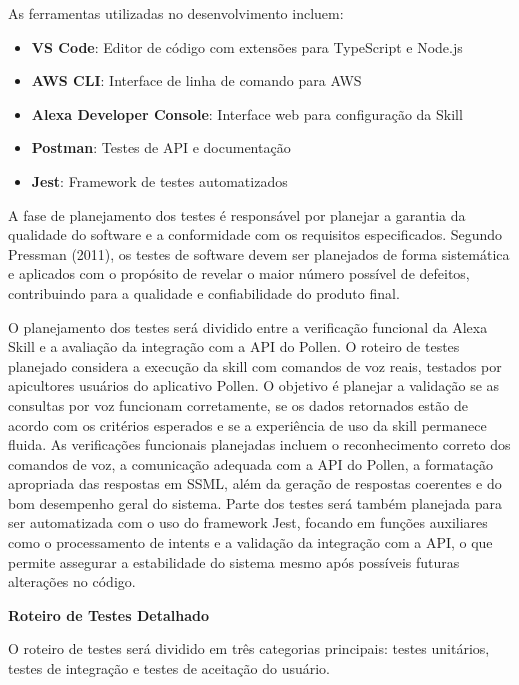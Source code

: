As ferramentas utilizadas no desenvolvimento incluem:

\begin{itemize}
    \item \textbf{VS Code}: Editor de código com extensões para TypeScript e Node.js
    \item \textbf{AWS CLI}: Interface de linha de comando para AWS
    \item \textbf{Alexa Developer Console}: Interface web para configuração da Skill
    \item \textbf{Postman}: Testes de API e documentação
    \item \textbf{Jest}: Framework de testes automatizados
\end{itemize}

\label{sssec:testes}

A fase de planejamento dos testes é responsável por planejar a garantia da qualidade do software e a conformidade com os requisitos especificados. 
Segundo Pressman (2011), os testes de software devem ser planejados de forma sistemática e aplicados com o propósito de revelar o maior número possível de defeitos, contribuindo para a qualidade e confiabilidade do produto final.

O planejamento dos testes será dividido entre a verificação funcional da Alexa Skill e a avaliação da integração com a API do Pollen. 
O roteiro de testes planejado considera a execução da skill com comandos de voz reais, testados por apicultores usuários do aplicativo Pollen. 
O objetivo é planejar a validação se as consultas por voz funcionam corretamente, se os dados retornados estão de acordo com os critérios esperados e se a experiência de uso da skill permanece fluida. 
As verificações funcionais planejadas incluem o reconhecimento correto dos comandos de voz, a comunicação adequada com a API do Pollen, a formatação apropriada das respostas em SSML, 
além da geração de respostas coerentes e do bom desempenho geral do sistema. Parte dos testes será também planejada para ser automatizada com o uso do framework Jest, 
focando em funções auxiliares como o processamento de intents e a validação da integração com a API, o que permite assegurar a estabilidade do sistema mesmo após possíveis futuras alterações no código.

\textbf{Roteiro de Testes Detalhado}

O roteiro de testes será dividido em três categorias principais: testes unitários, testes de integração e testes de aceitação do usuário.

